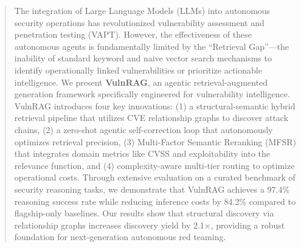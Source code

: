 \begin{abstract}
The integration of Large Language Models (LLMs) into autonomous security operations has revolutionized vulnerability assessment and penetration testing (VAPT). However, the effectiveness of these autonomous agents is fundamentally limited by the ``Retrieval Gap''—the inability of standard keyword and naive vector search mechanisms to identify operationally linked vulnerabilities or prioritize actionable intelligence. We present \textbf{VulnRAG}, an agentic retrieval-augmented generation framework specifically engineered for vulnerability intelligence. VulnRAG introduces four key innovations: (1) a structural-semantic hybrid retrieval pipeline that utilizes CVE relationship graphs to discover attack chains, (2) a zero-shot agentic self-correction loop that autonomously optimizes retrieval precision, (3) Multi-Factor Semantic Reranking (MFSR) that integrates domain metrics like CVSS and exploitability into the relevance function, and (4) complexity-aware multi-tier routing to optimize operational costs. Through extensive evaluation on a curated benchmark of security reasoning tasks, we demonstrate that VulnRAG achieves a 97.4\% reasoning success rate while reducing inference costs by 84.2\% compared to flagship-only baselines. Our results show that structural discovery via relationship graphs increases discovery yield by 2.1$\times$, providing a robust foundation for next-generation autonomous red teaming.
\end{abstract}
